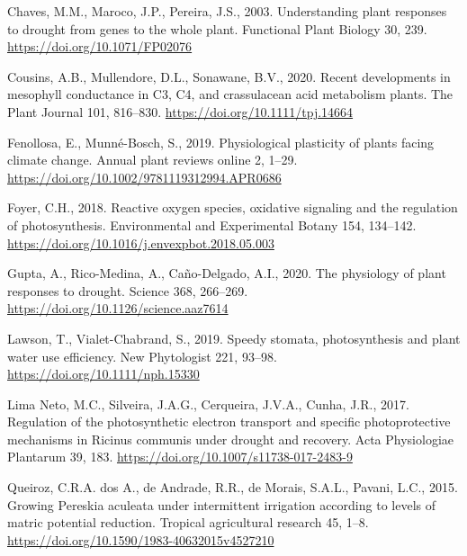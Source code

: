 \documentclass[
  12pt,
  letterpaper,
  DIV=11,
  numbers=noendperiod]{scrartcl}
\newlength{\cslhangindent}
\newlength{\cslentryspacingunit} %
\newenvironment{CSLReferences}[2] %
 {%
  \setlength{\parindent}{0pt}
  \ifodd #1
  \let\oldpar\par
  \def\par{\hangindent=\cslhangindent\oldpar}
  \fi
  \setlength{\parskip}{#2\cslentryspacingunit}
 }%
 {}
\begin{document}
\hypertarget{refs}{}
\begin{CSLReferences}{1}{0}
\leavevmode{}%
Chaves, M.M., Maroco, J.P., Pereira, J.S., 2003. Understanding plant
responses to drought \textemdash{} from genes to the whole plant.
Functional Plant Biology 30, 239. \url{https://doi.org/10.1071/FP02076}

\leavevmode{}%
Cousins, A.B., Mullendore, D.L., Sonawane, B.V., 2020. Recent
developments in mesophyll conductance in C3, C4, and crassulacean acid
metabolism plants. The Plant Journal 101, 816--830.
\url{https://doi.org/10.1111/tpj.14664}

\leavevmode{}%
Fenollosa, E., Munné-Bosch, S., 2019. Physiological plasticity of plants
facing climate change. Annual plant reviews online 2, 1--29.
\url{https://doi.org/10.1002/9781119312994.APR0686}

\leavevmode{}%
Foyer, C.H., 2018. Reactive oxygen species, oxidative signaling and the
regulation of photosynthesis. Environmental and Experimental Botany 154,
134--142. \url{https://doi.org/10.1016/j.envexpbot.2018.05.003}

\leavevmode{}%
Gupta, A., Rico-Medina, A., Caño-Delgado, A.I., 2020. The physiology of
plant responses to drought. Science 368, 266--269.
\url{https://doi.org/10.1126/science.aaz7614}

\leavevmode{}%
Lawson, T., Vialet-Chabrand, S., 2019. Speedy stomata, photosynthesis
and plant water use efficiency. New Phytologist 221, 93--98.
\url{https://doi.org/10.1111/nph.15330}

\leavevmode{}%
Lima Neto, M.C., Silveira, J.A.G., Cerqueira, J.V.A., Cunha, J.R., 2017.
Regulation of the photosynthetic electron transport and specific
photoprotective mechanisms in {Ricinus} communis under drought and
recovery. Acta Physiologiae Plantarum 39, 183.
\url{https://doi.org/10.1007/s11738-017-2483-9}

\leavevmode{}%
Queiroz, C.R.A. dos A., de Andrade, R.R., de Morais, S.A.L., Pavani,
L.C., 2015. Growing {Pereskia} aculeata under intermittent irrigation
according to levels of matric potential reduction. Tropical agricultural
research 45, 1--8. \url{https://doi.org/10.1590/1983-40632015v4527210}


\end{CSLReferences}
\end{document}
